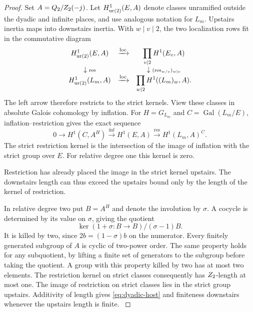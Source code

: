 \begin{proof}
Set \(A=Q_2/Z_2(-j)\). Let \(H^1_{\rm ur(2)}(E,A)\) denote classes unramified
outside the dyadic and infinite places, and use analogous
notation for \(L_m\). Upstairs inertia maps into downstairs
inertia. With \(w\mid v\mid2\), the two localization rows
fit in the commutative diagram
\[
 \begin{array}{ccc}
 H^1_{\rm ur(2)}(E,A)&\xrightarrow{\mathrm{loc}}&
      \displaystyle\prod_{v\mid2} H^1(E_v,A)\\
 \downarrow{\scriptstyle\mathrm{res}}&&\downarrow{\scriptstyle
                    (\mathrm{res}_{w/v})_{w\mid v}}\\
 H^1_{\rm ur(2)}(L_m,A)&\xrightarrow{\mathrm{loc}}&
      \displaystyle\prod_{w\mid2} H^1((L_m)_w,A).
 \end{array}
\]
The left arrow therefore restricts to the strict kernels. View these classes in absolute Galois cohomology
by inflation. For \(H=G_{L_m}\) and \(C=\operatorname{Gal}(L_m/E)\),
inflation--restriction gives the exact sequence
\[
 0\longrightarrow H^1(C,A^H)\xrightarrow{\mathrm{inf}} H^1(E,A)
             \xrightarrow{\mathrm{res}} H^1(L_m,A)^C .
\]
The strict restriction kernel is the intersection of the image
of inflation with the strict group over \(E\). For relative
degree one this kernel is zero.


Restriction has already placed the image in the strict kernel upstairs. The downstairs length can thus exceed the upstairs bound only by the length of the kernel of restriction.

In relative degree two put \(B=A^H\) and denote the
involution by \(\sigma\). A cocycle is determined by its value
on \(\sigma\), giving the quotient
\[
    \ker(1+\sigma:B\longrightarrow B)/(\sigma-1)B.
\]
It is killed by two, since \(2b=(1-\sigma)b\) on the numerator.
Every finitely generated subgroup of \(A\) is cyclic of
two-power order. The same property holds for any subquotient,
by lifting a finite set of generators to the subgroup before
taking the quotient. A group with this property killed by two
has at most two elements. The restriction kernel on strict
classes consequently has \(Z_2\)-length at most one. The image of restriction on strict classes
lies in the strict group upstairs. Additivity of length gives
\eqref{eq:dyadic-host} and finiteness downstairs whenever the
upstairs length is finite. \label{cor:cohomology-cohomology-1}
\end{proof}

